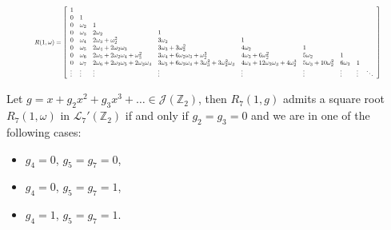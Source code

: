 \documentclass[10pt,a4paper]{amsart}
\begin{document}
\begin{equation} \label{eq.ass} \resizebox{.9\textwidth}{!}{$   R(1,\omega) = \left[\begin{array}{lllllllll} 1\\ 0 & 1  \\ 0 &\omega_2 & 1 \\0&\omega_3 & 2\omega_2& 1\\0& \omega_4&2\omega_3+\omega_2^2 & 3\omega_2& 1\\0& \omega_5&2\omega_4+2\omega_2\omega_3 & 3\omega_3+3\omega_2^2& 4\omega_2& 1\\ 0& \omega_6& 2\omega_5+2\omega_2\omega_4+\omega_3^2& 3\omega_4+6\omega_2\omega_3+\omega_2^3& 4\omega_3+6\omega_2^2& 5\omega_2&1 & \\
 0& \omega_7 & 2\omega_6+2\omega_2\omega_5+2\omega_3\omega_4 & 3\omega_5+6\omega_2\omega_4+3\omega_3^2+3\omega_2^2\omega_3 &4\omega_4+12\omega_2\omega_3+4\omega_2^3 &5\omega_3+10\omega_2^2 & 6\omega_2 & 1\\
 \vdots & \vdots&\vdots &\vdots & \vdots& \vdots&  \vdots&\vdots  &  \ddots \end{array}\right] $}\end{equation}

\begin{prop}
    
 Let $g=x+g_2x^2+g_3x^3+\ldots\in\mathcal J(\mathbb Z_2)$, then  $R_{7}(1,g)$ admits a square root $R_{7}(1,\omega)$ in $\mathcal{L}_{7}'(\mathbb Z_2)$  if and only if $g_2=g_3=0$ and we are in one of the following cases: 


\begin{itemize}

\item  $g_4=0$, $g_5=g_7=0$,

\item $g_4=0$, $g_5=g_7=1$,

\item  $g_4=1$, $g_5=g_7=1$.



\end{itemize}

\end{prop}
\end{document}
